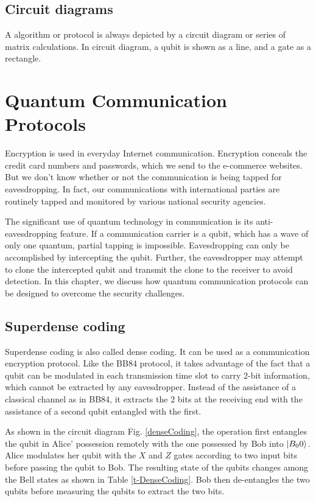 \documentclass[oneside, letter, 12pt]{book}
\begin{document}
\section{Circuit diagrams}
A algorithm or protocol is always depicted by a circuit diagram or series of matrix calculations. In circuit diagram, a qubit is shown as a line, and a gate as a rectangle.

\chapter{Quantum Communication Protocols}\label{c-comm}
Encryption is used in everyday Internet communication. Encryption conceals the credit card numbers and passwords, which we send to the e-commerce websites. But we don't know whether or not the communication is being tapped for eavesdropping. In fact, our communications with international parties are routinely tapped and monitored by various national security agencies.

The significant use of quantum technology in communication is its anti-eavesdropping feature. If a communication carrier is a qubit, which has a wave of only one quantum, partial tapping is impossible. Eavesdropping can only be accomplished by intercepting the qubit. Further, the eavesdropper may attempt to clone the intercepted qubit and transmit the clone to the receiver to avoid detection. In this chapter, we discuss how quantum communication protocols can be designed to overcome the security challenges.

\section{Superdense coding}
Superdense coding is also called dense coding. It can be used as a communication encryption protocol. Like the BB84 protocol, it takes advantage of the fact that a qubit can be modulated in each transmission time slot to carry 2-bit information, which cannot be extracted by any eavesdropper. Instead of the assistance of a classical channel as in BB84, it extracts the 2 bits at the receiving end with the assistance of a second qubit entangled with the first.

As shown in the circuit diagram Fig. \ref{denseCoding}, the operation first entangles the qubit in Alice' possession remotely with the one possessed by Bob into $\vert {B_00} \rangle_{}$. Alice modulates her qubit with the $X$ and $Z$ gates according to two input bits before passing the qubit to Bob. The resulting state of the qubits changes among the Bell states as shown in Table \ref{t-DenseCoding}. Bob then de-entangles the two qubits before measuring the qubits to extract the two bits.
\end{document}
